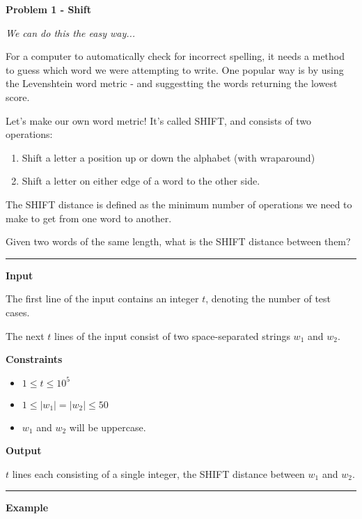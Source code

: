 \LARGE \textbf{Problem 1 - Shift} \normalsize

{\itshape We can do this the easy way...}

For a computer to  automatically check for incorrect spelling, 
it needs a method to guess which word we were attempting to write.
One popular way is by using the Levenshtein word metric - and suggestting the words returning the lowest score.

Let's make our own word metric! It's called SHIFT, and consists of two operations:

\begin{enumerate}
    \item Shift a letter a position up or down the alphabet (with wraparound)
    \item Shift a letter on either edge of a word to the other side.
\end{enumerate}

The SHIFT distance is defined as the minimum number of operations we need to make to get from one word to another.

Given two words of the same length, what is the SHIFT distance between them?

\vspace{8pt}
\hrule

\textbf{Input}

The first line of the input contains an integer $t$, denoting the number of test cases.

The next $t$ lines of the input consist of two space-separated strings $w_1$ and $w_2$.

\textbf{Constraints}

\begin{itemize}
    \item $1 \leq t \leq 10^5$
    \item $1 \leq |w_1| = |w_2| \leq 50$
    \item $w_1$ and $w_2$ will be uppercase.
\end{itemize}

\textbf{Output}

$t$ lines each consisting of a single integer, the SHIFT distance between $w_1$ and $w_2$.

\vspace{8pt}
\hrule

\textbf{Example}


